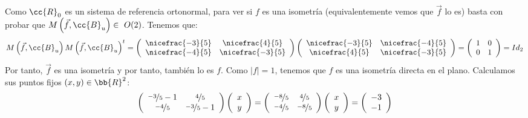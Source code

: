\begin{ejercicio}
\begin{enumerate}
        Como $\cc{R}_0$ es un sistema de referencia ortonormal, para ver si $f$ es una isometría (equivalentemente vemos que $\vec{f}$ lo es) basta con probar que $M\left(\vec{f}, \cc{B}_u\right)\in~O(2)$. Tenemos que:
        \begin{equation*}
            M\left(\vec{f},\cc{B}_u\right)M\left(\vec{f},\cc{B}_u\right)^t
            = 
            \left(
            \begin{array}{cc}
                \nicefrac{-3}{5} & \nicefrac{4}{5} \\
                \nicefrac{-4}{5} & \nicefrac{-3}{5} \\
            \end{array}
            \right)
            \left(
            \begin{array}{cc}
                \nicefrac{-3}{5} & \nicefrac{-4}{5} \\
                \nicefrac{4}{5} & \nicefrac{-3}{5} \\
            \end{array}
            \right)
            = 
            \left(
            \begin{array}{cc}
                1 & 0 \\
                0 & 1 \\
            \end{array}
            \right) = Id_2
        \end{equation*}
        Por tanto, $\vec{f}$ es una isometría y por tanto, también lo es $f$. Como $|f|=1$, tenemos que $f$ es una isometría directa en el plano. Calculamos sus puntos fijos $(x,y)\in \bb{R}^2$:
        \begin{equation*}
            \left(
            \begin{array}{cc}
                \nicefrac{-3}{5}-1 & \nicefrac{4}{5} \\
                \nicefrac{-4}{5} & \nicefrac{-3}{5}-1 \\
            \end{array}
            \right)
            \left(
            \begin{array}{c}
                x\\y
            \end{array}
            \right)
            =\left(
            \begin{array}{cc}
                \nicefrac{-8}{5} & \nicefrac{4}{5} \\
                \nicefrac{-4}{5} & \nicefrac{-8}{5} \\
            \end{array}
            \right)
            \left(
            \begin{array}{c}
                x\\y
            \end{array}
            \right)
            = \left(
            \begin{array}{c}
                -3\\-1
            \end{array}
            \right)
        \end{equation*}


\end{enumerate}
\end{ejercicio}

